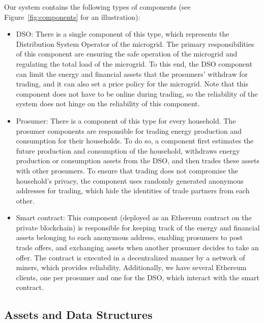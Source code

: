 Our system contains the following types of components (see Figure~\ref{fig:components} for an illustration):
\begin{itemize}[leftmargin=*]
\setlength{\itemsep}{0pt}%
    \setlength{\topsep}{0pt} 
    \setlength{\partopsep}{0pt}
    \setlength{\parsep}{0pt}
    \setlength{\parskip}{0pt}%
\item DSO: There is a single component of this type, which represents the Distribution System Operator of the microgrid. 
The primary responsibilities of this component are ensuring the safe operation of the microgrid and regulating the total load of the microgrid.
To this end, the DSO component can limit the energy and financial assets that the prosumers' withdraw for trading, and it can also set a price policy for the microgrid.
Note that this component does not have to be online during trading, so the reliability of the system does not hinge on the reliability of this component.
\item Prosumer: There is a component of this type for every household.
The prosumer components are responsible for trading energy production and consumption for their households.
To do so, a component first estimates the future production and consumption of the household, withdraws energy production or consumption assets from the DSO, and then trades these assets with other prosumers.
To ensure that trading does not compromise the household's privacy, the component uses randomly generated anonymous addresses for trading, which hide the identities of trade partners from each other.
\item Smart contract: 
This component (deployed as an Ethereum contract on the private blockchain) is responsible for keeping track of the energy and financial assets belonging to each anonymous address, enabling prosumers to post trade offers, and exchanging assets when another prosumer decides to take an offer.
The contract is executed in a decentralized manner by a network of miners, which provides reliability. Additionally, we have several Ethereum clients, one per prosumer and one for the DSO, which interact with the smart contract.
\end{itemize}

\vspace{-0.08in}
\subsection{Assets and Data Structures}

